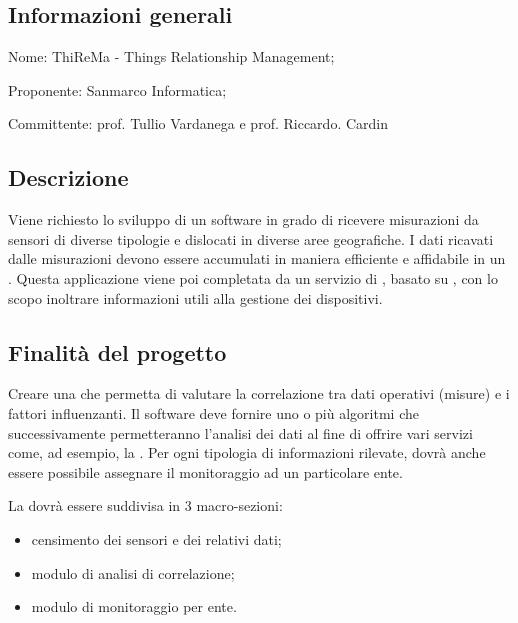 \documentclass[../studio-di-fattibilita.tex]{subfiles}
\begin{document}
\subsection{Informazioni generali}%
\label{sub:informazioni_generale}
\begin{description}
  \item Nome: ThiReMa - Things Relationship Management;
  \item Proponente: Sanmarco Informatica;
  \item Committente: prof. Tullio Vardanega e prof. Riccardo. Cardin
\end{description}

\subsection{Descrizione}%
\label{sub:descrizione}
Viene richiesto lo sviluppo di un software in grado di ricevere misurazioni da sensori di diverse tipologie e dislocati in diverse aree geografiche. I dati ricavati dalle misurazioni devono essere accumulati in maniera efficiente e affidabile in un . Questa applicazione viene poi completata da un servizio di , basato su , con lo scopo inoltrare informazioni utili alla gestione dei dispositivi.

\subsection{Finalità del progetto}%
\label{sub:finalita_del_progetto}
Creare una  che permetta di  valutare la correlazione tra dati operativi (misure) e i fattori influenzanti. Il software deve fornire uno o più algoritmi che successivamente permetteranno l'analisi dei dati al fine di offrire vari servizi come, ad esempio, la .
Per ogni tipologia di informazioni rilevate, dovrà anche essere possibile assegnare il monitoraggio ad un particolare ente.

La  dovrà essere suddivisa in 3 macro-sezioni:
\begin{itemize}
    \item censimento dei sensori e dei relativi dati;
    \item modulo di analisi di correlazione;
    \item modulo di monitoraggio per ente.
\end{itemize}
\end{document}
